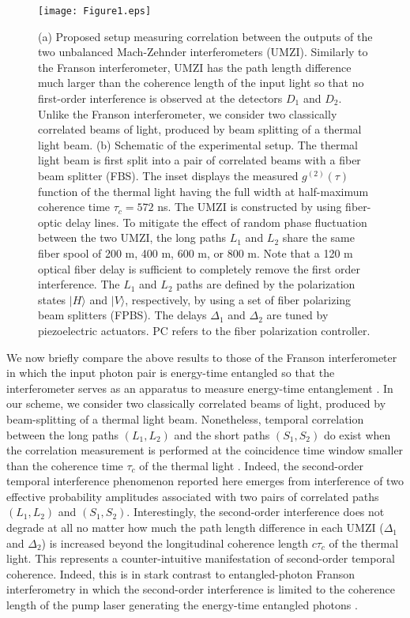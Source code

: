 \documentclass[aps,prl,reprint,showpacs,superscriptaddress]{revtex4-1}
\begin{document}
\begin{figure*}[t]
\texttt{[image: Figure1.eps]}
\caption{(a) Proposed setup measuring correlation between the outputs of the two unbalanced Mach-Zehnder interferometers (UMZI). Similarly to the Franson interferometer, UMZI has the path length difference much larger than the coherence length of the input light so that no first-order interference is observed at the detectors $D_1$ and $D_2$. Unlike the Franson interferometer, we consider two classically correlated beams of light, produced by beam splitting of a thermal light beam.
(b) Schematic of the experimental setup. The thermal light beam is first split into a pair of correlated beams with a fiber beam splitter (FBS). The inset displays the measured $g^{(2)}(\tau)$ function of the thermal light having the full width at half-maximum coherence time $\tau_c=572$ ns. The UMZI is constructed by using fiber-optic delay lines. To mitigate the effect of random phase fluctuation between the two UMZI, the long paths $L_1$ and $L_2$ share the same fiber spool of 200 m, 400 m, 600 m, or 800 m. Note that a 120 m optical fiber delay is sufficient to completely remove the first order interference. The $L_1$ and $L_2$ paths are defined by the polarization states $|H\rangle$ and $|V\rangle$, respectively, by using a set of fiber polarizing beam splitters (FPBS). The delays $\Delta_1$ and $\Delta_2$ are tuned by piezoelectric actuators. PC refers to the fiber polarization controller. 
}\label{fig:setup}
\end{figure*}

We now briefly compare the above results to those of the Franson interferometer in which the input photon pair is  energy-time entangled so that the interferometer serves as an apparatus to measure energy-time entanglement \cite{Franson89,Shih93a,Kwiat93a,Strekalov96}.  In our scheme, we consider two classically correlated beams of light, produced by beam-splitting of a thermal light beam. Nonetheless, temporal correlation between the long paths $(L_1,L_2)$  and the short paths $(S_1,S_2)$  do exist when the correlation measurement is performed at the coincidence time window  smaller than  the coherence time $\tau_c$ of the thermal light  \cite{Tamma16a}. 
Indeed, the second-order temporal interference phenomenon reported here emerges  from interference of two  effective probability amplitudes associated with two pairs of correlated paths $(L_1,L_2)$ and $(S_1,S_2)$.  Interestingly, the second-order interference does not degrade at all no matter how much the  path length difference in each UMZI ($\Delta_1$ and $\Delta_2$) is increased beyond the longitudinal coherence length $c\tau_c$ of the thermal light. This represents a counter-intuitive manifestation of second-order temporal coherence. Indeed, this is in stark contrast to  entangled-photon Franson interferometry in which the second-order interference is limited to the coherence length of the pump laser generating the energy-time entangled photons \cite{Shih93a,Kwiat93a,Strekalov96}.
\end{document}
